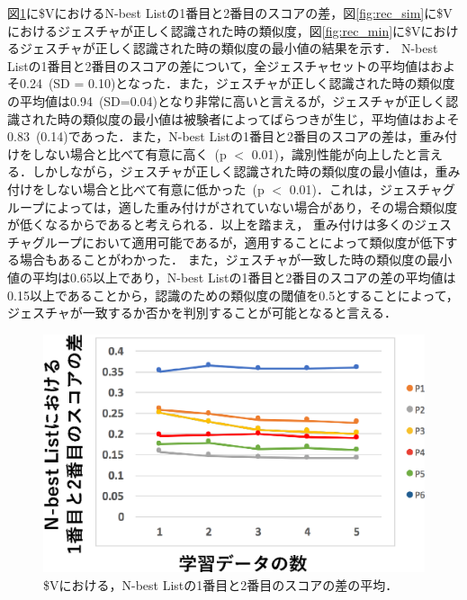 図\ref{fig:rec_diff}に\$VにおけるN-best Listの1番目と2番目のスコアの差，図\ref{fig:rec_sim}に\$Vにおけるジェスチャが正しく認識された時の類似度，図\ref{fig:rec_min}に\$Vにおけるジェスチャが正しく認識された時の類似度の最小値の結果を示す．
N-best Listの1番目と2番目のスコアの差について，全ジェスチャセットの平均値はおよそ0.24~(SD = 0.10)となった．また，ジェスチャが正しく認識された時の類似度の平均値は0.94~(SD=0.04)となり非常に高いと言えるが，ジェスチャが正しく認識された時の類似度の最小値は被験者によってばらつきが生じ，平均値はおよそ0.83~(0.14)であった．また，N-best Listの1番目と2番目のスコアの差は，重み付けをしない場合と比べて有意に高く~(p $<$ 0.01)，識別性能が向上したと言える．しかしながら，ジェスチャが正しく認識された時の類似度の最小値は，重み付けをしない場合と比べて有意に低かった~(p $<$ 0.01)．これは，ジェスチャグループによっては，適した重み付けがされていない場合があり，その場合類似度が低くなるからであると考えられる．以上を踏まえ，%
重み付けは多くのジェスチャグループにおいて適用可能であるが，適用することによって類似度が低下する場合もあることがわかった．
また，ジェスチャが一致した時の類似度の最小値の平均は0.65以上であり，N-best Listの1番目と2番目のスコアの差の平均値は0.15以上であることから，認識のための類似度の閾値を0.5とすることによって，ジェスチャが一致するか否かを判別することが可能となると言える．
\begin{figure}[!h]
\centering
\includegraphics[width=0.7\columnwidth]{img/rec_diff.eps}
\caption{\$Vにおける，N-best Listの1番目と2番目のスコアの差の平均．}
\label{fig:rec_diff}
\end{figure}

